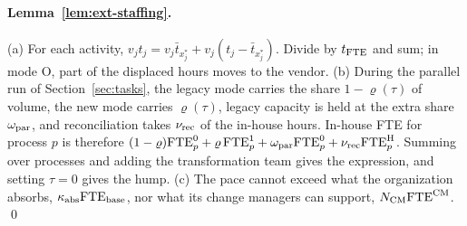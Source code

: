 \paragraph{Lemma~\ref{lem:ext-staffing}.} (a) For each activity, $v_jt_j=v_j\bar t_{x^*_j}+v_j(t_j-\bar t_{x^*_j})$. Divide by $t_{\rm FTE}$ and sum; in mode O, part of the displaced hours moves to the vendor. (b) During the parallel run of Section~\ref{sec:tasks}, the legacy mode carries the share $1-\varrho(\tau)$ of volume, the new mode carries $\varrho(\tau)$, legacy capacity is held at the extra share $\omega_{\rm par}$, and reconciliation takes $\nu_{\rm rec}$ of the in-house hours. In-house FTE for process $p$ is therefore $(1-\varrho)\mathrm{FTE}^0_p+\varrho\,\mathrm{FTE}^1_p+\omega_{\rm par}\mathrm{FTE}^0_p+\nu_{\rm rec}\mathrm{FTE}^{\mathrm H}_p$. Summing over processes and adding the transformation team gives the expression, and setting $\tau=0$ gives the hump. (c) The pace cannot exceed what the organization absorbs, $\kappa_{\rm abs}\mathrm{FTE}_{\rm base}$, nor what its change managers can support, $N_{\rm CM}\mathrm{FTE}^{\rm CM}$. \qed

